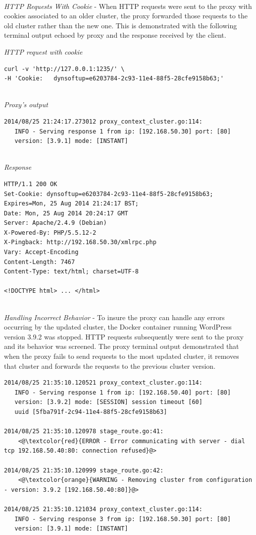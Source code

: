 \documentclass[a4paper,11pt,twoside]{report}
\begin{document}
\noindent\\
\textit{HTTP Requests With Cookie} - When HTTP requests were sent to the proxy with cookies  associated to an older cluster, the proxy forwarded those requests to the old cluster rather than the new one. This is demonstrated with the following terminal output echoed by proxy and the response received by the client. \medskip 

\noindent
\textit{HTTP request with cookie}
\begin{lstlisting}[language=terminal]
curl -v 'http://127.0.0.1:1235/' \
-H 'Cookie:   dynsoftup=e6203784-2c93-11e4-88f5-28cfe9158b63;'
\end{lstlisting}

\noindent\\
\textit{Proxy's output}
\begin{lstlisting}[language=terminal]
2014/08/25 21:24:17.273012 proxy_context_cluster.go:114:     
   INFO - Serving response 1 from ip: [192.168.50.30] port: [80] 
   version: [3.9.1] mode: [INSTANT]
\end{lstlisting}

\noindent\\
\textit{Response}
\begin{lstlisting}[language=terminal]
HTTP/1.1 200 OK
Set-Cookie: dynsoftup=e6203784-2c93-11e4-88f5-28cfe9158b63; Expires=Mon, 25 Aug 2014 21:24:17 BST;
Date: Mon, 25 Aug 2014 20:24:17 GMT
Server: Apache/2.4.9 (Debian)
X-Powered-By: PHP/5.5.12-2
X-Pingback: http://192.168.50.30/xmlrpc.php
Vary: Accept-Encoding
Content-Length: 7467
Content-Type: text/html; charset=UTF-8

<!DOCTYPE html> ... </html>
\end{lstlisting}

\noindent\\
\textit{Handling Incorrect Behavior} - To insure the proxy can handle any errors occurring by the updated cluster, the Docker container running WordPress version 3.9.2 was stopped. HTTP requests subsequently were sent to the proxy and its behavior was screened. The proxy terminal output demonstrated that when the proxy fails to send requests to the most updated cluster, it removes that cluster and forwards the requests to the previous cluster version.  \smallskip

\begin{lstlisting}[language=terminal]
2014/08/25 21:35:10.120521 proxy_context_cluster.go:114:     
   INFO - Serving response 1 from ip: [192.168.50.40] port: [80] 
   version: [3.9.2] mode: [SESSION] session timeout [60] 
   uuid [5fba791f-2c94-11e4-88f5-28cfe9158b63]

2014/08/25 21:35:10.120978 stage_route.go:41:    
    <@\textcolor{red}{ERROR - Error communicating with server - dial tcp 192.168.50.40:80: connection refused}@>
   
2014/08/25 21:35:10.120999 stage_route.go:42:  
    <@\textcolor{orange}{WARNING - Removing cluster from configuration - version: 3.9.2 [192.168.50.40:80]}@>

2014/08/25 21:35:10.121034 proxy_context_cluster.go:114:     
   INFO - Serving response 3 from ip: [192.168.50.30] port: [80] 
   version: [3.9.1] mode: [INSTANT]
\end{lstlisting}
 
\end{document}
